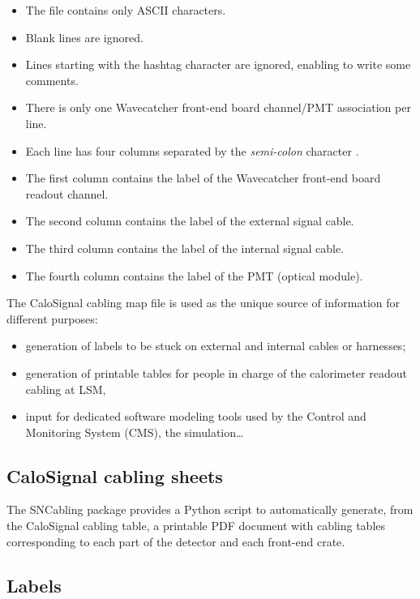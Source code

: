 \begin{itemize}
\item The file contains only ASCII characters.
\item Blank lines are ignored.
\item Lines starting with the hashtag character \fbox{\texttt{\#}} are
  ignored, enabling to write some comments.
\item  There  is  only  one Wavecatcher  front-end  board  channel/PMT
  association per line.
\item Each  line has four  columns separated by  the \emph{semi-colon}
  character \fbox{\texttt{;}}.
\item The first column contains the label of the Wavecatcher front-end
  board readout channel.
\item The second column contains the label of the external signal cable.
\item The third column contains the label of the internal signal cable.
\item  The  fourth column  contains  the  label  of the  PMT  (optical
  module).
\end{itemize}

\par\noindent The  CaloSignal cabling map  file is used as  the unique
source of information for different purposes:
\begin{itemize}
\item generation of labels to be stuck on external and internal cables
  or harnesses;
\item  generation of  printable tables  for  people in  charge of  the
  calorimeter readout cabling at LSM,
\item input for dedicated software  modeling tools used by the Control
  and Monitoring System (CMS), the simulation\dots
\end{itemize}


\subsection{CaloSignal cabling sheets}


The  SNCabling  package  provides  a Python  script  to  automatically
generate, from the CaloSignal cabling  table, a printable PDF document
with cabling  tables corresponding  to each part  of the  detector and
each front-end crate.

\subsection{Labels}

